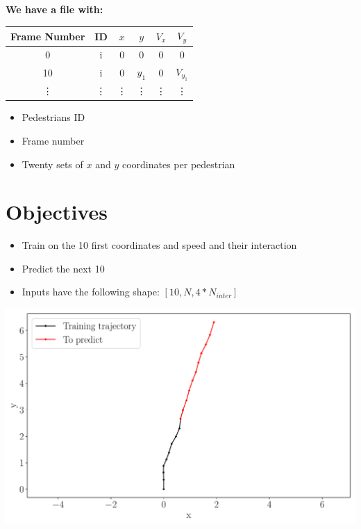 \documentclass[a0,portrait]{a0poster}
\begin{document}
\begin{multicols}{2}
\vspace{3cm}

\textbf{We have a file with:} \\

\begin{minipage}[]{0.5\linewidth}
\centering
\begin{tabular}{|c|c|c|c|c|c|}
\hline
Frame Number & ID & $x$ & $y$ & $ V_x$ & $V_y$ \\ \hline
        0     &  i  &  0 &  0 &  0 &  0 \\ \hline
        10     &  i  &  0 &  $y_1$ &  0 &  $V_{y_1}$ \\ \hline
        \vdots     &  \vdots &  \vdots & \vdots &  \vdots &  \vdots \\ \hline
\end{tabular}
\end{minipage}


\begin{minipage}[]{0.5\linewidth}
\begin{itemize}
\item Pedestrians ID
\item Frame number 
\item Twenty sets of $x$ and $y$ coordinates per pedestrian
\end{itemize}
\end{minipage}


\section*{Objectives}

\begin{minipage}[]{0.5\linewidth}
\begin{itemize}
\item Train on the 10 first coordinates and speed and their interaction
\item Predict the next 10 
\item Inputs have the following shape: $[10,N,4 * N_{inter}]$ 
\end{itemize}
\end{minipage}

\begin{minipage}[]{0.5\linewidth}
\centerline {\includegraphics[scale = 0.6]{figure/examplepres}}
\end{minipage}


\end{multicols}
\end{document}
